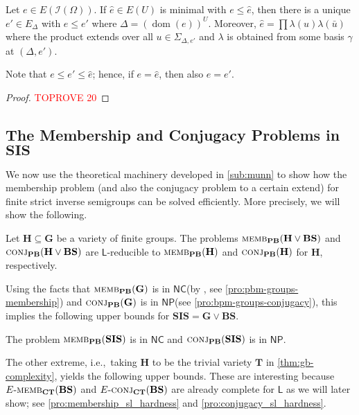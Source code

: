 \documentclass[anonymous,letter,UKenglish,cleveref,autoref,thm-restate]{lipics-v2021}
\renewcommand{\leq}{\leqslant}
\newcommand{\ie}{i.e.,~}
\newcommand{\sse}{\subseteq}
\newcommand{\dom}{\operatorname{dom}}
\newcommand{\NC}{\ensuremath{\mathsf{NC}}\xspace}
\newcommand{\LOGSPACE}{\ensuremath{\mathsf{L}}\xspace}
\newcommand{\NP}{\ensuremath{\mathsf{NP}}\xspace}
\newcommand{\vT}{\ensuremath{\mathbf{T}}}
\newcommand{\vH}{\ensuremath{\mathbf{H}}}
\newcommand{\vG}{\ensuremath{\mathbf{G}}}
\newcommand{\vSI}{\ensuremath{\mathbf{SIS}}}
\newcommand{\vBS}{\ensuremath{\mathbf{BS}}}  \newcommand{\vBM}{\ensuremath{\mathbf{BM}}}
\newcommand{\ISym}{\cI}
\newcommand{\cI}{\mathcal{I}}
\theoremstyle{plain}
\theoremstyle{plain}
\newcommand{\dMemb}[2][]{\textup{\textsc{memb${}_{\mathbf{#1}}\expandafter\ifx\expandafter\relax\detokenize{#2}\relax\else(#2)\fi$}}}
\newcommand{\dConj}[2][]{\textup{\textsc{conj${}_{\mathbf{#1}}\expandafter\ifx\expandafter\relax\detokenize{#2}\relax\else(#2)\fi$}}}
\newcommand{\dEMemb}[2][]{\ensuremath{E}\textnormal{-}\dMemb[#1]{#2}}
\newcommand{\dEConj}[2][]{\ensuremath{E}\textnormal{-}\dConj[#1]{#2}}
\begin{document}
\begin{lemma}\label{lem:gb-munn-idempotent}
  Let $e \in E(\ISym(\Omega))$.
   If $\hat e \in E(U)$ is minimal with $e \leq \hat e$, then there is a unique $e' \in E_\Delta$ with $e \leq e'$ where $\Delta = (\dom(e))^U$.
  Moreover, $\hat e = \prod \lambda(u)\lambda(\bar u)$ where the product extends over all $u \in \Sigma_{\Delta, e'}$ and $\lambda$ is obtained from some basis $\gamma$ at $(\Delta, e')$.
\end{lemma}

Note that $e \leq e' \leq \hat e$; hence, if $e= \hat e$, then also $e = e'$.

\begin{proof}\textcolor{red}{TOPROVE 20}\end{proof}



\subsection{The Membership and Conjugacy Problems in $\vSI$}\label{sub:sis}

We now use the theoretical machinery developed in \cref{sub:munn} to show how the membership problem (and also the conjugacy problem to a certain extend) for finite strict inverse semigroups can be solved efficiently.
More precisely, we will show the following.

\begin{theorem}\label{thm:gb-complexity}
Let $\vH \sse \vG$ be a variety of finite groups. The problems $\dMemb[PB]{\vH\vee \vBS}$ and $\dConj[PB]{\vH \vee \vBS}$ are \LOGSPACE-reducible to $\dMemb[PB]{\vH}$ and $\dConj[PB]{\vH}$ for $\vH$, respectively.
\end{theorem}

Using the facts that $\dMemb[PB]{\vG}$ is in \NC (by {\cite{BabaiLS87}}, see \cref{pro:pbm-groups-membership}) and $\dConj[PB]{\vG}$ is in \NP (see \cref{pro:bpm-groups-conjugacy}), this implies the following upper bounds for $\vSI = \vG \vee \vBS$.

\begin{corollary}\label{cor:gb-complexity}
The problem	$\dMemb[PB]{\vSI}$ is in \NC and $\dConj[PB]{\vSI}$ is in \NP.
\end{corollary}

The other extreme, \ie taking $\vH$ to be the trivial variety $\vT$ in \cref{thm:gb-complexity}, yields the following upper bounds.
These are interesting because $\dEMemb[CT]{\vBS}$ and $\dEConj[CT]{\vBS}$ are already complete for \LOGSPACE{} as we will later show; see \cref{pro:membership_sl_hardness} and \cref{pro:conjugacy_sl_hardness}.
\end{document}
